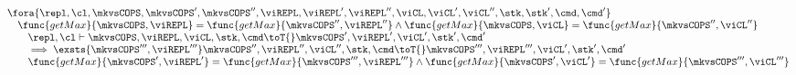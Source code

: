 \begin{lemma}
\[
    \begin{array}{@{}l@{}}
    \fora{\repl, \cl, \mkvsCOPS, \mkvsCOPS', \mkvsCOPS'', \viREPL, \viREPL', \viREPL'', \viCL, \viCL', \viCL'', \stk, \stk', \cmd, \cmd'} \\
    \quad \func{getMax}{\mkvsCOPS, \viREPL} = \func{getMax}{\mkvsCOPS'', \viREPL''} 
    \land \func{getMax}{\mkvsCOPS, \viCL} = \func{getMax}{\mkvsCOPS'', \viCL''} \\
    \qquad \repl, \cl \vdash 
    \mkvsCOPS, \viREPL, \viCL, \stk, \cmd \toT{}
    \mkvsCOPS', \viREPL', \viCL', \stk', \cmd' \\
    \qquad \implies 
    \exsts{\mkvsCOPS''', \viREPL'''}
    \mkvsCOPS'', \viREPL'', \viCL'', \stk, \cmd \toT{}
    \mkvsCOPS''', \viREPL''', \viCL', \stk', \cmd' \\
    \qquad \func{getMax}{\mkvsCOPS', \viREPL'} = \func{getMax}{\mkvsCOPS''', \viREPL'''} 
    \land \func{getMax}{\mkvsCOPS', \viCL'} = \func{getMax}{\mkvsCOPS''', \viCL'''} \\
    \end{array}
\]
\end{lemma}
